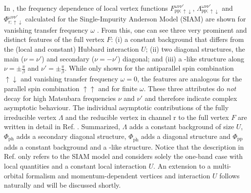 \documentclass[../../main.tex]{subfiles}
\begin{document}
In , the frequency dependence of local vertex functions $F^{\omega\nu\nu'}_{\text{pp};\uparrow\downarrow}$, $\Lambda^{\omega\nu\nu'}_{\text{pp};\uparrow\downarrow}$ and $\Phi^{\omega\nu\nu'}_{\text{r};\uparrow\downarrow}$ calculated for the Single-Impurity Anderson Model (SIAM) are shown for vanishing transfer frequency $\omega$ \cite{high-freq asympt}. From this, one can see three very prominent and distinct features of the full vertex $F$: (i) a constant background that differs from the (local and constant) Hubbard interaction $U$; (ii) two diagonal structures, the main ($\nu=\nu'$) and secondary ($\nu=-\nu'$) diagonal; and (iii) a -like structure along $\nu=\pm\frac\pi\beta$ and $\nu'=\pm\frac\pi\beta$. While only shown for the antiparallel spin combination $\uparrow\downarrow$ and vanishing transfer frequency $\omega=0$, the features are analogous for the parallel spin combination $\uparrow\uparrow$ and for finite $\omega$. These three attributes do \textit{not} decay for high Matsubara frequencies $\nu$ and $\nu'$ and therefore indicate complex asymptotic behaviour. The individual asymptotic contributions of the fully irreducible vertex $\Lambda$ and the reducible vertex in channel r to the full vertex $F$ are written in detail in Ref. \cite{high-freq asympt}. Summarized, $\Lambda$ adds a constant background of size $U$, $\Phi_{\text{ph}}$ adds a secondary diagonal structure, $\Phi_{\overline{\text{ph}}}$ adds a diagonal structure and $\Phi_{\text{pp}}$ adds a constant background and a -like structure. Notice that the description in Ref. \cite{high-freq asympt} only refers to the SIAM model and considers solely the one-band case with local quantities and a constant local interaction $U$. An extension to a multi-orbital formalism and momentum-dependent vertices and interaction $U$ follows naturally and will be discussed shortly.
\end{document}
